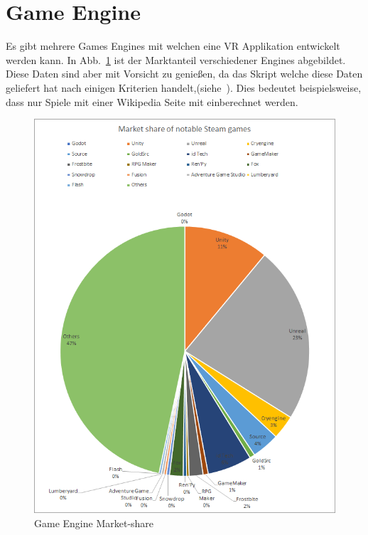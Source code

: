 \section{Game Engine}\label{sec:game-engine}

Es gibt mehrere Games Engines mit welchen eine VR Applikation entwickelt werden kann.
In Abb.~\ref{fig:game_engine_marketshare} ist der Marktanteil verschiedener Engines abgebildet.
Diese Daten sind aber mit Vorsicht zu genießen, da das Skript welche diese Daten geliefert hat nach einigen Kriterien handelt,(siehe~\cite{REDDIT_2018}).
Dies bedeutet beispielsweise, dass nur Spiele mit einer Wikipedia Seite mit einberechnet werden.

\begin{figure}
    \centering
    \includegraphics[scale=0.4]{pics/game_engine_marketshare}
    \caption{Game Engine Market-share~\cite{REDDIT_2018}}
    \label{fig:game_engine_marketshare}
\end{figure}

